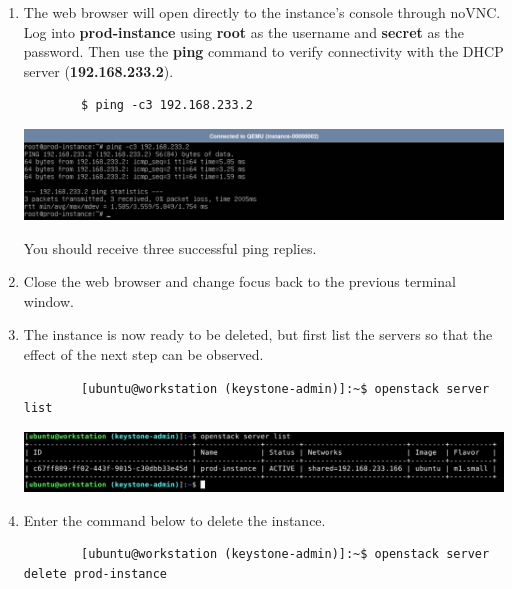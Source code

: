 \documentclass[letterpaper, 12pt]{article}
\begin{document}
\begin{enumerate}
    \item The web browser will open directly to the instance's console through noVNC. Log into \textbf{prod-instance}
    using \textbf{root} as the username and \textbf{secret} as the password. Then use the \textbf{ping} command to
    verify connectivity with the DHCP server (\textbf{192.168.233.2}).
    \begin{lstlisting}
        $ ping -c3 192.168.233.2
    \end{lstlisting}

    \begin{center}
        \includegraphics[width=\linewidth]{images/part2/step17.png}
    \end{center}

    \begin{notebox}
        You should receive three successful ping replies.
    \end{notebox}

    \item Close the web browser and change focus back to the previous terminal window.

    \item The instance is now ready to be deleted, but first list the servers so that the effect of the next step can be
    observed.
    \begin{lstlisting}
        [ubuntu@workstation (keystone-admin)]:~$ openstack server list
    \end{lstlisting}

    \begin{center}
        \includegraphics[width=\linewidth]{images/part2/step19.png}
    \end{center}

    \item Enter the command below to delete the instance.
    \begin{lstlisting}
        [ubuntu@workstation (keystone-admin)]:~$ openstack server delete prod-instance
    \end{lstlisting}


\end{enumerate}
\end{document}
